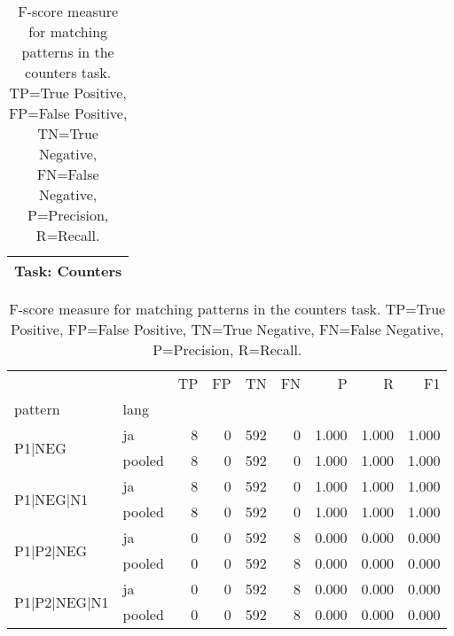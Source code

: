 
\begin{table}[h!]
\centering
\begin{tabular}{p{}}
\toprule
\textbf{Task: Counters} \\
\midrule
\end{tabular}
\vspace{10pt}
\begin{tabular}{llrrrrrrr}
\toprule
 &  & TP & FP & TN & FN & P & R & F1 \\
pattern & lang &  &  &  &  &  &  &  \\
\midrule
\multirow[t]{2}{*}{P1|NEG} & ja & 8 & 0 & 592 & 0 & 1.000 & 1.000 & 1.000 \\
 & pooled & 8 & 0 & 592 & 0 & 1.000 & 1.000 & 1.000 \\
\cline{1-9}
\multirow[t]{2}{*}{P1|NEG|N1} & ja & 8 & 0 & 592 & 0 & 1.000 & 1.000 & 1.000 \\
 & pooled & 8 & 0 & 592 & 0 & 1.000 & 1.000 & 1.000 \\
\cline{1-9}
\multirow[t]{2}{*}{P1|P2|NEG} & ja & 0 & 0 & 592 & 8 & 0.000 & 0.000 & 0.000 \\
 & pooled & 0 & 0 & 592 & 8 & 0.000 & 0.000 & 0.000 \\
\cline{1-9}
\multirow[t]{2}{*}{P1|P2|NEG|N1} & ja & 0 & 0 & 592 & 8 & 0.000 & 0.000 & 0.000 \\
 & pooled & 0 & 0 & 592 & 8 & 0.000 & 0.000 & 0.000 \\
\cline{1-9}
\bottomrule
\end{tabular}
\caption{F-score measure for matching patterns in the counters task. TP=True Positive, FP=False Positive, TN=True Negative, FN=False Negative, P=Precision, R=Recall.}
\label{tab:counters_f1}
\end{table}
